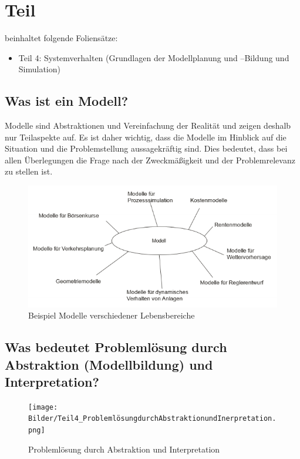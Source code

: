 \section{Teil}
beinhaltet folgende Foliensätze:

\begin{itemize}
    \item Teil 4:  Systemverhalten (Grundlagen der Modellplanung und –Bildung und Simulation)

\end{itemize}

\subsection{Was ist ein Modell?}
Modelle sind Abstraktionen und Vereinfachung der Realität und zeigen deshalb nur Teilaspekte auf.
Es ist daher wichtig, dass die Modelle im Hinblick auf die Situation und die Problemstellung aussagekräftig sind.
Dies bedeutet, dass bei allen Überlegungen die Frage nach der Zweckmäßigkeit und der Problemrelevanz zu stellen ist.
\begin{figure}[H]
    \centering
    \includegraphics[width=0.6\linewidth]{Bilder/Teil4_ModelleBeispiel1.png}
    \caption{Beispiel Modelle verschiedener Lebensbereiche}
\end{figure}
\subsection{Was bedeutet Problemlösung durch Abstraktion (Modellbildung) und Interpretation?}
\begin{figure}[H]
    \centering
    \texttt{[image: Bilder/Teil4\_ProblemlösungdurchAbstraktionundInerpretation.png]}
    \caption{Problemlösung durch Abstraktion und Interpretation}
\end{figure}

\newpage
